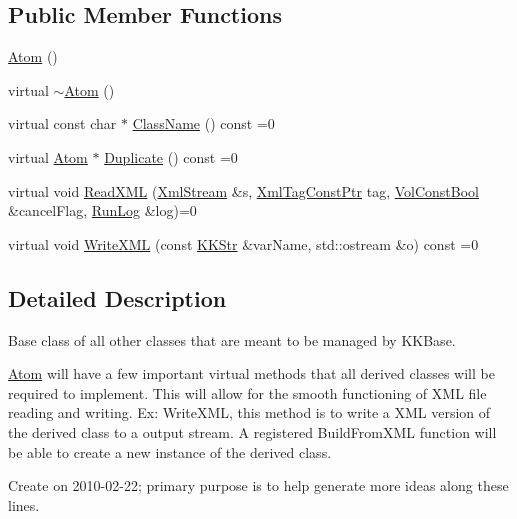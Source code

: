 \subsection*{Public Member Functions}
\begin{DoxyCompactItemize}
\item 
\hyperlink{class_k_k_b_1_1_atom_aa0147d7e49ab90f559b66e38d3d12863}{Atom} ()
\item 
virtual \hyperlink{class_k_k_b_1_1_atom_a6926cfb6d5e61ca21c71476b66547a5e}{$\sim$\+Atom} ()
\item 
virtual const char $\ast$ \hyperlink{class_k_k_b_1_1_atom_ae590752a285480b6b342def2f09b175f}{Class\+Name} () const  =0
\item 
virtual \hyperlink{class_k_k_b_1_1_atom}{Atom} $\ast$ \hyperlink{class_k_k_b_1_1_atom_a990c54fb9a7fd0928a479987fa499065}{Duplicate} () const  =0
\item 
virtual void \hyperlink{class_k_k_b_1_1_atom_add1971b30cf26b54ca37d56adbac9c82}{Read\+X\+ML} (\hyperlink{class_k_k_b_1_1_xml_stream}{Xml\+Stream} \&s, \hyperlink{namespace_k_k_b_a5f1b0b1667d79fec26deeff10c43df23}{Xml\+Tag\+Const\+Ptr} tag, \hyperlink{namespace_k_k_b_a7d390f568e2831fb76b86b56c87bf92f}{Vol\+Const\+Bool} \&cancel\+Flag, \hyperlink{class_k_k_b_1_1_run_log}{Run\+Log} \&log)=0
\item 
virtual void \hyperlink{class_k_k_b_1_1_atom_a6af114f9ae398f653b506e765e4e1eb6}{Write\+X\+ML} (const \hyperlink{class_k_k_b_1_1_k_k_str}{K\+K\+Str} \&var\+Name, std\+::ostream \&o) const  =0
\end{DoxyCompactItemize}


\subsection{Detailed Description}
Base class of all other classes that are meant to be managed by \textquotesingle{}K\+K\+Base\textquotesingle{}. 

\textquotesingle{}\hyperlink{class_k_k_b_1_1_atom}{Atom}\textquotesingle{} will have a few important virtual methods that all derived classes will be required to implement. This will allow for the smooth functioning of X\+ML file reading and writing. Ex\+: \textquotesingle{}Write\+X\+ML\textquotesingle{}, this method is to write a X\+ML version of the derived class to a output stream. A registered Build\+From\+X\+ML function will be able to create a new instance of the derived class.

Create on 2010-\/02-\/22; primary purpose is to help generate more ideas along these lines. 

